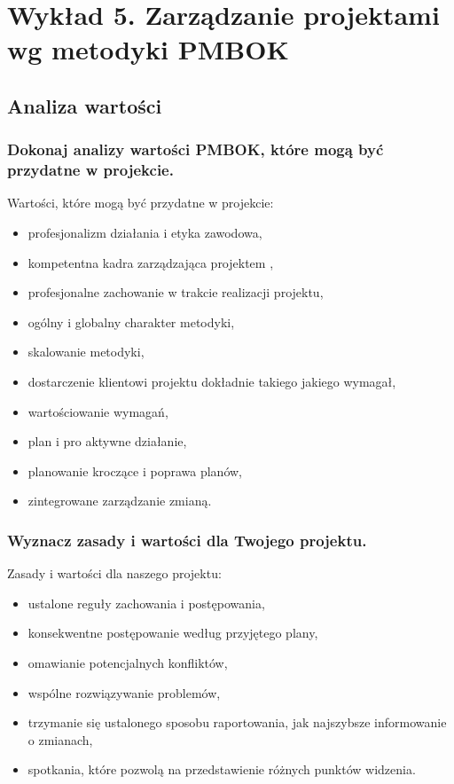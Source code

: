 \chapter{Wykład 5. Zarządzanie projektami wg metodyki PMBOK}

\section{Analiza wartości}
\subsection*{Dokonaj analizy wartości PMBOK, które mogą być przydatne w projekcie.}

Wartości, które mogą być przydatne w projekcie:
\begin{itemize}
\item profesjonalizm działania i etyka zawodowa, 
\item kompetentna kadra zarządzająca projektem ,
\item profesjonalne zachowanie w trakcie realizacji projektu,
\item ogólny i globalny charakter metodyki,
\item skalowanie metodyki, 
\item dostarczenie klientowi projektu dokładnie takiego jakiego wymagał,
\item wartościowanie wymagań,
\item plan i pro aktywne działanie,
\item planowanie kroczące i poprawa planów,
\item zintegrowane zarządzanie zmianą. 
\end{itemize}

\subsection*{Wyznacz zasady i wartości dla Twojego projektu.}

Zasady i wartości dla naszego projektu:
\begin{itemize}
\item ustalone reguły zachowania i postępowania,
\item konsekwentne postępowanie według przyjętego plany,
\item omawianie potencjalnych konfliktów,
\item wspólne rozwiązywanie problemów,
\item trzymanie się ustalonego sposobu raportowania, jak najszybsze informowanie o zmianach,
\item spotkania, które pozwolą na przedstawienie różnych punktów widzenia.
\end{itemize}

